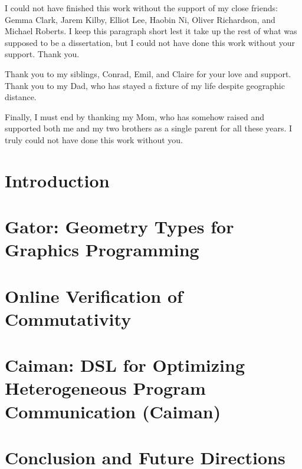 \documentclass[phd,tocprelim]{cornell}
\begin{document}
\begin{acknowledgements}
I could not have finished this work without the support of my close friends: Gemma Clark, Jarem Kilby, Elliot Lee, Haobin Ni, Oliver Richardson, and Michael Roberts.  I keep this paragraph short lest it take up the rest of what was supposed to be a dissertation, but I could not have done this work without your support.  Thank you.

Thank you to my siblings, Conrad, Emil, and Claire for your love and support.  Thank you to my Dad, who has stayed a fixture of my life despite geographic distance.

Finally, I must end by thanking my Mom, who has somehow raised and supported both me and my two brothers as a single parent for all these years.  I truly could not have done this work without you.

\end{acknowledgements}

\contentspage
\tablelistpage
\figurelistpage

\normalspacing \setcounter{page}{1} 
\pagestyle{cornell} \addtolength{\parskip}{0.5\baselineskip}

\chapter{Introduction}



\chapter{Gator: Geometry Types for Graphics Programming}



\chapter{Online Verification of Commutativity}



\chapter{Caiman: DSL for Optimizing Heterogeneous Program Communication (Caiman)}



\chapter{Conclusion and Future Directions}
\end{document}
